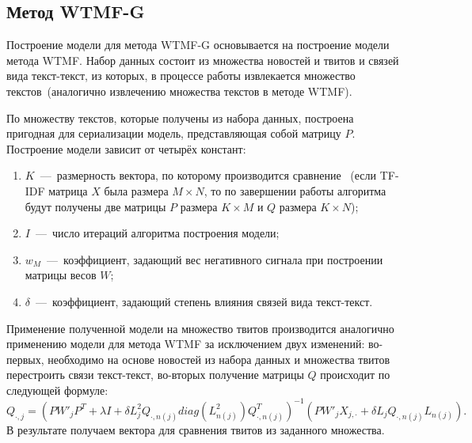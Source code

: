 \subsection{Метод WTMF-G}
    Построение модели для метода WTMF-G основывается на построение модели метода WTMF.
    Набор данных состоит из множества новостей и твитов и связей вида текст-текст, из которых, в процессе работы извлекается множество
    текстов~(аналогично извлечению множества текстов в методе WTMF).

    По множеству текстов, которые получены из набора данных, построена пригодная для сериализации модель, представляющая собой матрицу $P$.
    Построение модели зависит от четырёх констант:
    \begin{enumerate}
        \item $K$~---~размерность вектора, по которому производится сравнение~
        (если TF-IDF матрица $X$ была размера $M \times N$, то по завершении работы алгоритма будут получены две матрицы $P$ размера $K \times M$ и $Q$ размера $K \times N$);
        \item $I$~---~число итераций алгоритма построения модели;
        \item $w_M$~---~коэффициент, задающий вес негативного сигнала при построении матрицы весов $W$;
        \item $\delta$~---~коэффициент, задающий степень влияния связей вида текст-текст.
    \end{enumerate}

    Применение полученной модели на множество твитов производится аналогично применению модели для метода WTMF за исключением двух изменений:
    во-первых, необходимо на основе новостей из набора данных и множества твитов перестроить связи текст-текст, во-вторых получение матрицы $Q$ происходит по следующей формуле:
    \begin{equation}
        Q_{\cdot, j} = (P W'_j P^T + \lambda I + \delta  L_j^2 Q_{\cdot,n(j)} diag(L^2_{n(j)})Q_{\cdot,n(j)}^T)^{-1}   (P W'_j X_{j,\cdot} + \delta  L_j Q_{\cdot,n(j)} L_{n(j)}).
    \end{equation}
    В результате получаем вектора для сравнения твитов из заданного множества.